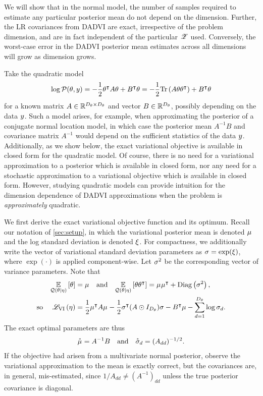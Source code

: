 We will show that in the normal model, the number of samples required to
estimate any particular posterior mean do not depend on the dimension.  Further,
the LR covariances from DADVI are exact, irrespective of the problem dimension,
and are in fact independent of the particular $\mathscr{Z}$ used.  Conversely, the
worst-case error in the DADVI posterior mean estimates across all dimensions
will grow as dimension grows.

Take the quadratic model
%
\begin{align}\label{eq:quadratic_model}
%
\logjoint =
    -\frac{1}{2} \theta^\trans A \theta + B^\trans \theta =
    -\frac{1}{2} \trace{A \theta \theta^\trans } + B^\trans \theta
%
\end{align}
%
for a known matrix $A \in \mathbb{R}^{D_{\theta} \times D_{\theta}}$ and vector $B \in
\mathbb{R}^{D_{\theta}}$, possibly depending on the data $y$.  Such a model arises,
for example, when approximating the posterior of a conjugate normal location
model, in which case the posterior mean $A^{-1} B$ and covariance matrix
$A^{-1}$ would depend on the sufficient statistics of the data $y$.
Additionally, as we show below, the exact variational objective is available in
closed form for the quadratic model. Of course, there is no need for a
variational approximation to a posterior which is available in closed form, nor
any need for a stochastic approximation to a variational objective which is
available in closed form. However, studying quadratic models can provide
intuition for the dimension dependence of DADVI approximations when the problem
is {\em approximately} quadratic.

We first derive the exact variational objective function and its optimum. Recall
our notation of \cref{sec:setup}, in which the variational posterior mean is
denoted $\mu_{}$ and the log standard deviation is denoted $\xi_{}$.  For
compactness, we additionally write the vector of variational standard deviation
parameters as $\sigma_{} = \exp(\xi_{})$, where $\exp(\cdot)$ is applied
component-wise. Let $\sigma_{}^2$ be the corresponding vector of variance
parameters. Note that
%
\begin{align*}
%
\expect{\q(\theta \vert \eta)}{\theta} ={}& \etamu
\quad\textrm{and}\quad
\expect{\q(\theta \vert \eta)}{\theta \theta^\trans} ={}
    \etamu \etamu^\trans + \diag{\etasigma^2}, \\
\textrm{so } \quad
\klfullobj{\eta} ={}&
    \frac{1}{2} \etamu^\trans A \etamu
    -\frac{1}{2} \etasigma^\trans (A \odot I_{\thetadim}) \etasigma
    - B^\trans \mu
    -\sumd \log \etasigma[d].
%
\end{align*}
%
The exact optimal parameters are thus
%
\begin{align*}
%
\etamustar = A^{-1}B
\quad\textrm{and}\quad
\etasigmastar[d] = (A_{dd})^{-1/2}.
%
\end{align*}
%
\def\zbar{\bar{z}}
\def\zzbar{\overline{zz^\trans}}
\def\sigmat{S}
\def\zcov{\hat{\Sigma}_{z}}
%
If the objective had arisen from a multivariate normal posterior, observe the
variational approximation to the mean is exactly correct, but the covariances
are, in general, mis-estimated, since $1 / A_{dd} \ne (A^{-1})_{dd}$ unless the
true posterior covariance is diagonal.


